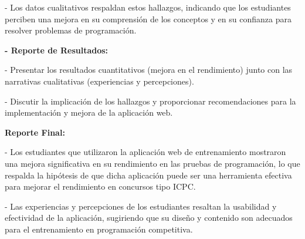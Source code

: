   - Los datos cualitativos respaldan estos hallazgos, indicando que los estudiantes perciben una mejora en su comprensión de los conceptos y en su confianza para resolver problemas de programación.

\textbf{- Reporte de Resultados:}

  - Presentar los resultados cuantitativos (mejora en el rendimiento) junto con las narrativas cualitativas (experiencias y percepciones).
  
  - Discutir la implicación de los hallazgos y proporcionar recomendaciones para la implementación y mejora de la aplicación web.

  \textbf{Reporte Final:}
  
  - Los estudiantes que utilizaron la aplicación web de entrenamiento mostraron una mejora significativa en su rendimiento en las pruebas de programación, lo que respalda la hipótesis de que dicha aplicación puede ser una herramienta efectiva para mejorar el rendimiento en concursos tipo ICPC.
  
  - Las experiencias y percepciones de los estudiantes resaltan la usabilidad y efectividad de la aplicación, sugiriendo que su diseño y contenido son adecuados para el entrenamiento en programación competitiva.

